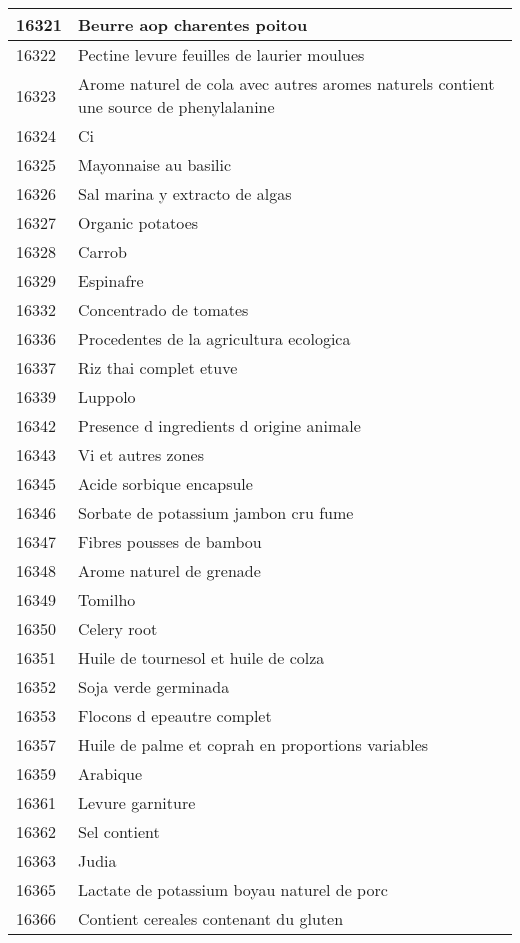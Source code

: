 \begin{longtable}{|l|l|}
16321 & Beurre aop charentes poitou \\ \hline 
16322 & Pectine levure feuilles de laurier moulues \\ \hline 
16323 & Arome naturel de cola avec autres aromes naturels contient une source de phenylalanine \\ \hline 
16324 & Ci \\ \hline 
16325 & Mayonnaise au basilic \\ \hline 
16326 & Sal marina y extracto de algas \\ \hline 
16327 & Organic potatoes \\ \hline 
16328 & Carrob \\ \hline 
16329 & Espinafre \\ \hline 
16332 & Concentrado de tomates \\ \hline 
16336 & Procedentes de la agricultura ecologica \\ \hline 
16337 & Riz thai complet etuve \\ \hline 
16339 & Luppolo \\ \hline 
16342 & Presence d ingredients d origine animale \\ \hline 
16343 & Vi et autres zones \\ \hline 
16345 & Acide sorbique encapsule \\ \hline 
16346 & Sorbate de potassium jambon cru fume \\ \hline 
16347 & Fibres pousses de bambou \\ \hline 
16348 & Arome naturel de grenade \\ \hline 
16349 & Tomilho \\ \hline 
16350 & Celery root \\ \hline 
16351 & Huile de tournesol et huile de colza \\ \hline 
16352 & Soja verde germinada \\ \hline 
16353 & Flocons d epeautre complet \\ \hline 
16357 & Huile de palme et coprah en proportions variables \\ \hline 
16359 & Arabique \\ \hline 
16361 & Levure garniture \\ \hline 
16362 & Sel contient \\ \hline 
16363 & Judia \\ \hline 
16365 & Lactate de potassium boyau naturel de porc \\ \hline 
16366 & Contient cereales contenant du gluten \\ \hline 

\end{longtable}

